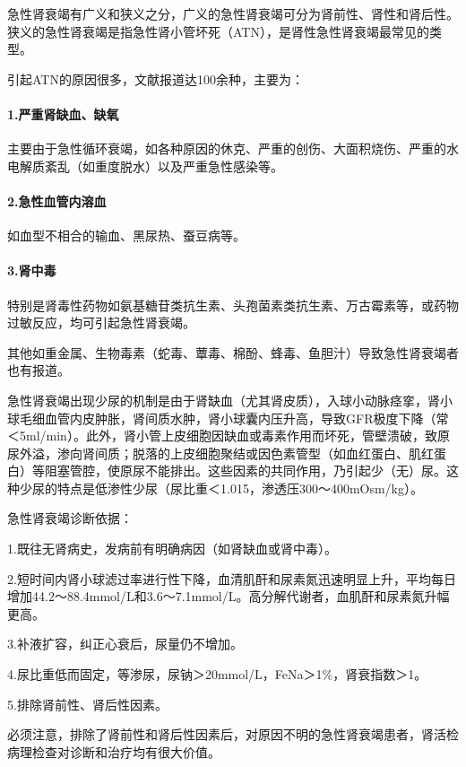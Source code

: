 急性肾衰竭有广义和狭义之分，广义的急性肾衰竭可分为肾前性、肾性和肾后性。狭义的急性肾衰竭是指急性肾小管坏死（ATN），是肾性急性肾衰竭最常见的类型。

引起ATN的原因很多，文献报道达100余种，主要为：

\paragraph{1.严重肾缺血、缺氧}

主要由于急性循环衰竭，如各种原因的休克、严重的创伤、大面积烧伤、严重的水电解质紊乱（如重度脱水）以及严重急性感染等。

\paragraph{2.急性血管内溶血}

如血型不相合的输血、黑尿热、蚕豆病等。

\paragraph{3.肾中毒}

特别是肾毒性药物如氨基糖苷类抗生素、头孢菌素类抗生素、万古霉素等，或药物过敏反应，均可引起急性肾衰竭。

其他如重金属、生物毒素（蛇毒、蕈毒、棉酚、蜂毒、鱼胆汁）导致急性肾衰竭者也有报道。

急性肾衰竭出现少尿的机制是由于肾缺血（尤其肾皮质），入球小动脉痉挛，肾小球毛细血管内皮肿胀，肾间质水肿，肾小球囊内压升高，导致GFR极度下降（常＜5ml/min）。此外，肾小管上皮细胞因缺血或毒素作用而坏死，管壁溃破，致原尿外溢，渗向肾间质；脱落的上皮细胞聚结或因色素管型（如血红蛋白、肌红蛋白）等阻塞管腔，使原尿不能排出。这些因素的共同作用，乃引起少（无）尿。这种少尿的特点是低渗性少尿（尿比重＜1.015，渗透压300～400mOsm/kg）。

急性肾衰竭诊断依据：

1.既往无肾病史，发病前有明确病因（如肾缺血或肾中毒）。

2.短时间内肾小球滤过率进行性下降，血清肌酐和尿素氮迅速明显上升，平均每日增加44.2～88.4mmol/L和3.6～7.1mmol/L。高分解代谢者，血肌酐和尿素氮升幅更高。

3.补液扩容，纠正心衰后，尿量仍不增加。

4.尿比重低而固定，等渗尿，尿钠＞20mmol/L，FeNa＞1\%，肾衰指数＞1。

5.排除肾前性、肾后性因素。

必须注意，排除了肾前性和肾后性因素后，对原因不明的急性肾衰竭患者，肾活检病理检查对诊断和治疗均有很大价值。

